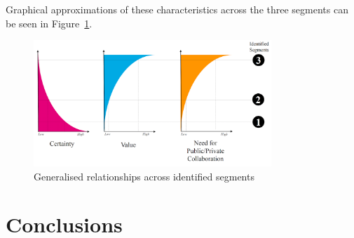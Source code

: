\documentclass[b5paper,10pt]{article}
\begin{document}
Graphical approximations of these characteristics across the three
segments can be seen in Figure~\ref{fig:segmentcharacteristics}.

\begin{figure}[!h]
\centering
\includegraphics[width=0.8\textwidth]{images/segmentcharacteristics.png}
\caption{Generalised relationships across identified segments}
\label{fig:segmentcharacteristics}
\end{figure}




 


\section{Conclusions}\label{conclusion}
\end{document}

